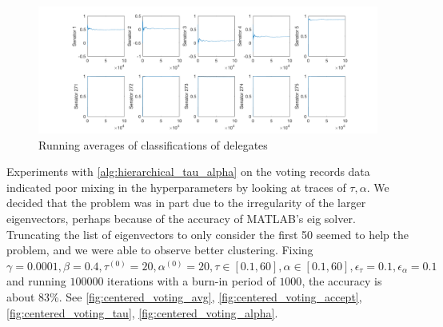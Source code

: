 \documentclass{siamart1116}
\begin{document}
\begin{figure}[!htb]
\caption{\label{fig:mcmc_gamma_senators} Running averages of classifications of delegates}
\centering
\includegraphics[width=\linewidth]{voting/mcmc_gamma/senator_avgs.png}
\end{figure}
Experiments with \cref{alg:hierarchical_tau_alpha} on the voting records data indicated poor mixing in the hyperparameters by looking at traces of $\tau, \alpha$. We decided that the problem was in part due to the irregularity of the larger eigenvectors, perhaps because of the accuracy of MATLAB's eig solver. Truncating the list of eigenvectors to only consider the first 50 seemed to help the problem, and we were able to observe better clustering. Fixing $\gamma = 0.0001, \beta = 0.4, \tau^{(0)}=20,\alpha^{(0)}=20,\tau\in[0.1,60],\alpha\in[0.1,60],\epsilon_\tau=0.1,\epsilon_\alpha=0.1$ and running $100000$ iterations with a burn-in period of $1000$, the accuracy is about 83\%. See \cref{fig:centered_voting_avg}, \cref{fig:centered_voting_accept}, \cref{fig:centered_voting_tau}, \cref{fig:centered_voting_alpha}.
\end{document}
